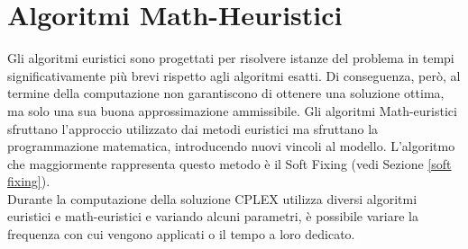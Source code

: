 \section{Algoritmi Math-Heuristici}
Gli algoritmi euristici sono progettati per risolvere istanze del problema in tempi significativamente più brevi rispetto agli algoritmi esatti. Di conseguenza, però, al termine della computazione non garantiscono di ottenere una soluzione ottima, ma solo una sua buona approssimazione ammissibile. Gli algoritmi Math-euristici sfruttano l'approccio utilizzato dai metodi euristici ma sfruttano la programmazione matematica, introducendo nuovi vincoli al modello. L'algoritmo che maggiormente rappresenta questo metodo è il Soft Fixing (vedi Sezione \ref{soft fixing}). \\
Durante la computazione della soluzione CPLEX utilizza diversi algoritmi euristici e math-euristici e variando alcuni parametri, è possibile variare la frequenza con cui vengono applicati o il tempo a loro dedicato. 

